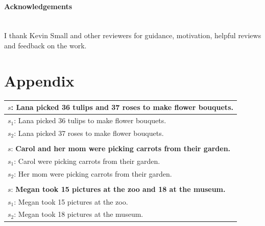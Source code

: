 \documentclass[11pt]{article}
\begin{document}
\paragraph{Acknowledgements} \hspace{0pt} \\
I thank Kevin Small and other reviewers for guidance, motivation, helpful reviews and feedback on the work.

\newpage
\section{Appendix}

\begin{table}[h!]
\centering
\begin{tabular}{ | m{35em} | }
\hline
\begin{math}s\end{math}: \textbf{Lana picked 36 tulips and 37 roses to make flower bouquets.} \\
\hline
\begin{math}s_{1}\end{math}: Lana picked 36 tulips to make flower bouquets. \\
\hline
\begin{math}s_{2}\end{math}: Lana picked 37 roses to make flower bouquets. \\
\hline
\\
\hline
\begin{math}s\end{math}: \textbf{Carol and her mom were picking carrots from their garden.} \\
\hline
\begin{math}s_{1}\end{math}: Carol were picking carrots from their garden. \\
\hline
\begin{math}s_{2}\end{math}: Her mom were picking carrots from their garden. \\
\hline
\\
\hline
\begin{math}s\end{math}: \textbf{Megan took 15 pictures at the zoo and 18 at the museum.} \\
\hline
\begin{math}s_{1}\end{math}: Megan took 15 pictures at the zoo. \\
\hline
\begin{math}s_{2}\end{math}: Megan took 18 pictures at the museum. \\

\end{tabular}
\end{table}
\end{document}
